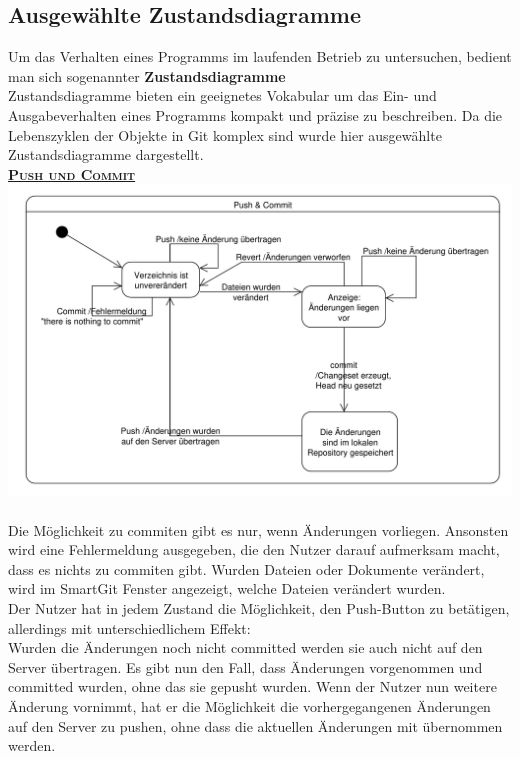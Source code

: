 \documentclass[a4paper]{article}
\begin{document}
\newpage		
\subsection{Ausgewählte Zustandsdiagramme} \label{sec:zustandsd}

	Um das Verhalten eines Programms im laufenden Betrieb zu untersuchen, bedient man sich sogenannter \textbf{Zustandsdiagramme} \\
	Zustandsdiagramme bieten ein geeignetes Vokabular um das Ein- und Ausgabeverhalten eines Programms kompakt und präzise zu beschreiben.
	Da die Lebenszyklen der Objekte in Git komplex sind wurde hier ausgewählte Zustandsdiagramme dargestellt. \\

\underline{\textbf{\textsc{Push und Commit}}} \\
\includegraphics[width=\textwidth]{PuCo.pdf}\\\\
Die Möglichkeit zu commiten gibt es nur, wenn Änderungen vorliegen. Ansonsten wird eine Fehlermeldung ausgegeben, die den Nutzer darauf aufmerksam macht, dass es nichts zu commiten gibt.
Wurden Dateien oder Dokumente verändert, wird im SmartGit Fenster angezeigt, welche Dateien verändert wurden.\\
Der Nutzer hat in jedem Zustand die Möglichkeit, den Push-Button zu betätigen, allerdings mit unterschiedlichem Effekt:\\
Wurden die Änderungen noch nicht committed werden sie auch nicht auf den Server übertragen.
Es gibt nun den Fall, dass Änderungen vorgenommen und committed wurden, ohne das sie gepusht wurden.
Wenn der Nutzer nun weitere Änderung vornimmt, hat er die Möglichkeit die vorhergegangenen Änderungen auf den Server zu pushen, ohne dass die aktuellen Änderungen mit übernommen werden. 
\end{document}
